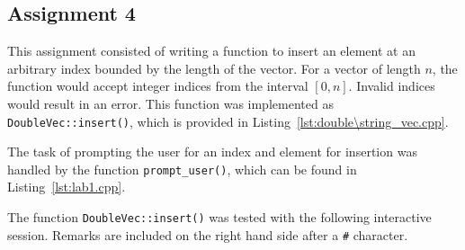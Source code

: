 \documentclass[11pt, letterpaper]{article} %
\begin{document}
\subsection*{Assignment 4}

This assignment consisted of writing a function to insert an element at an arbitrary index bounded by the length of the vector. For a vector of length $n$, the function would accept integer indices from the interval $[0,n]$. Invalid indices would result in an error. This function was implemented as \texttt{DoubleVec::insert()}, which is provided in Listing~\ref{lst:double\string_vec.cpp}.

The task of prompting the user for an index and element for insertion was handled by the function \texttt{prompt\_user()}, which can be found in Listing~\ref{lst:lab1.cpp}.

The function \texttt{DoubleVec::insert()} was tested with the following interactive session. Remarks are included on the right hand side after a \texttt{\#} character.
\end{document}
